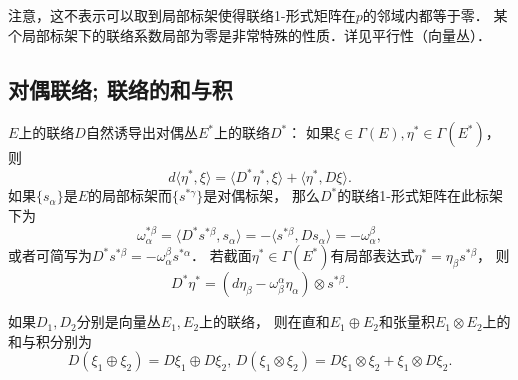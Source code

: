 注意，这不表示可以取到局部标架使得联络1-形式矩阵在$p$的邻域内都等于零． 某个局部标架下的联络系数局部为零是非常特殊的性质．详见平行性（向量丛）．

\subsection{对偶联络; 联络的和与积}
$E$上的联络$D$自然诱导出对偶丛$E^*$上的联络$D^*$： 如果$\xi\in\Gamma(E),\eta^*\in\Gamma(E^*)$， 则
$$
d\langle \eta^*,\xi\rangle=\langle D^*\eta^*,\xi\rangle+\langle \eta^*,D\xi\rangle.
$$
如果$\{s_\alpha\}$是$E$的局部标架而$\{s^{*\gamma}\}$是对偶标架， 那么$D^*$的联络1-形式矩阵在此标架下为
$$
\omega^{*\beta}_\alpha
=\langle D^*s^{*\beta},s_\alpha\rangle
=-\langle s^{*\beta},Ds_\alpha\rangle
=-\omega^\beta_\alpha,
$$
或者可简写为$D^*s^{*\beta}=-\omega^\beta_\alpha s^{*\alpha}$． 若截面$\eta^*\in\Gamma(E^*)$有局部表达式$\eta^*=\eta_\beta s^{*\beta}$， 则
$$
D^*\eta^*=(d\eta_\beta-\omega_\beta^\alpha\eta_\alpha)\otimes s^{*\beta}.
$$

如果$D_1,D_2$分别是向量丛$E_1,E_2$上的联络， 则在直和$E_1\oplus E_2$和张量积$E_1\otimes E_2$上的和与积分别为
$$
D(\xi_1\oplus \xi_2)=D\xi_1\oplus D\xi_2,
\,
D(\xi_1\otimes \xi_2)=D\xi_1\otimes \xi_2+\xi_1\otimes D\xi_2.
$$